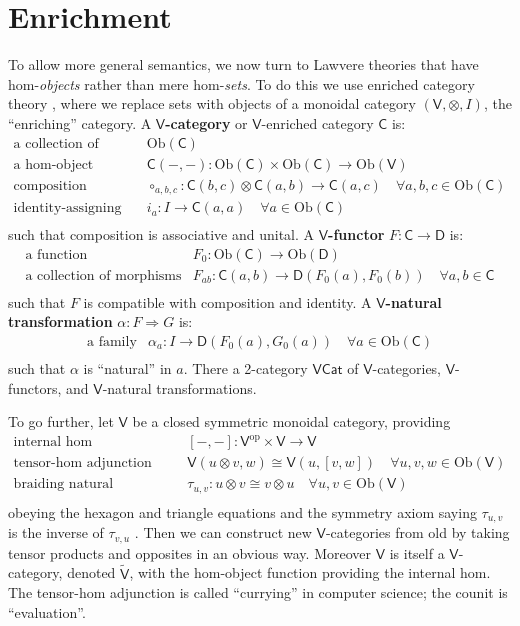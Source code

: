 \documentclass{amsart}
\theoremstyle{definition}
\newcommand{\Cat}{\mathsf{Cat}}
\newcommand{\V}{\mathsf{V}}
\newcommand{\D}{\mathsf{D}}
\newcommand{\C}{\mathsf{C}}
\newcommand{\op}{\mathrm{op}}
\newcommand{\Obj}{\mathrm{Ob}}
\newcommand{\maps}{\colon}
\begin{document}
\section{Enrichment}

To allow more general semantics, we now turn to Lawvere theories that have hom-\emph{objects} rather than mere hom-\emph{sets}.  To do this we use enriched category theory \cite{kelly}, where we replace sets with objects of a monoidal category  $(\V,\otimes,I)$, the ``enriching'' category.   A \textbf{$\V$-category} or $\V$-enriched category $\C$ is:
\[\begin{array}{rl}
\text{a collection of objects} & \Obj(\C)\\
\text{a hom-object function} & \C(-,-)\maps \Obj(\C) \times \Obj(\C) \to \Obj(\V)\\
\text{composition morphisms} & \circ_{a,b,c}\maps\C(b,c) \otimes \C(a,b) \to \C(a,c) \quad \forall a,b,c \in \Obj(\C)\\
\text{identity-assigning morphisms} & i_a\maps I\to\C(a,a) \quad \forall a \in \Obj(\C)\\
\end{array}\]
such that composition is associative and unital.  A \textbf{$\V$-functor} $F\maps\C \to \D$ is:
\[\begin{array}{rl}
\text{a function} & F_0\maps \Obj(\C) \to \Obj(\D)\\
\text{a collection of morphisms} & F_{ab}\maps \C(a,b) \to \D(F_0(a),F_0(b)) \quad \forall a,b \in \C\\
\end{array}\]
such that $F$ is compatible with composition and identity.  A \textbf{$\V$-natural transformation} $\alpha\maps F \Rightarrow G$ is:
\[\begin{array}{rl}
\text{a family} & \alpha_a\maps I \to \D(F_0(a),G_0(a)) \quad \forall a \in \Obj(\C)\\
\end{array}\]
such that $\alpha$ is ``natural'' in $a$.   There a 2-category \textbf{$\V\Cat$} of $\V$-categories, $\V$-functors, and $\V$-natural transformations. 

To go further, let $\V$ be a closed symmetric monoidal category, providing
\[\begin{array}{rl}
\text{internal hom} & [-,-]\maps\V^\op \times \V \to \V\\
\text{tensor-hom adjunction} & \V(u\otimes v,w) \cong \V(u,[v,w]) \quad \forall u,v,w \in \Obj(\V)\\
\text{braiding natural isomorphism} & \tau_{u,v}\maps u \otimes v \cong v \otimes u \quad \forall u,v \in \Obj(\V)\\
\end{array}\]
obeying the hexagon and triangle equations and the symmetry axiom saying $\tau_{u,v}$ is the inverse of $\tau_{v,u}$ \cite{maclane}.   Then we can construct new $\V$-categories from old by taking tensor products and opposites in an obvious way.   Moreover $\V$ is itself a $\V$-category, denoted $\tilde{\V}$, with the hom-object function providing the internal hom.  The tensor-hom adjunction is called ``currying'' in computer science; the counit is ``evaluation''.  
\end{document}
